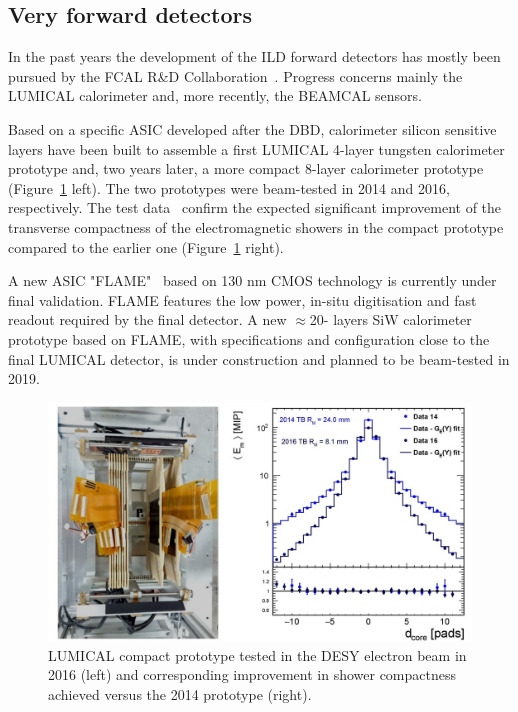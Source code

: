 \subsection{Very forward detectors}

In the past years the development of the ILD forward detectors has mostly been pursued by the FCAL R\&D Collaboration~\cite{ild:bib:FCAL}. Progress concerns mainly the LUMICAL calorimeter and, more recently, the BEAMCAL sensors.

Based on a specific ASIC developed after the DBD, calorimeter silicon sensitive layers have been built to assemble a first LUMICAL 4-layer tungsten calorimeter prototype and, two years later, a more compact 8-layer calorimeter prototype (Figure~\ref{fig:det:LUMICAL_perf} left). The two prototypes were beam-tested in 2014 and 2016, respectively. The test data~\cite{Abramowicz:2018vwb} confirm the expected significant improvement of the transverse compactness of the electromagnetic showers in the compact prototype compared to the earlier one (Figure~\ref{fig:det:LUMICAL_perf} right). 

A new ASIC "FLAME"~\cite{ild:bib:FLAME} based on 130 nm CMOS technology is currently under final validation. FLAME features the low power, in-situ digitisation and fast readout required by the final detector. A new $\approx$20- layers SiW calorimeter prototype based on FLAME, with specifications and configuration close to the final LUMICAL detector, is under construction and planned to be beam-tested in 2019. 

\begin{figure}[t!]
\centering
\includegraphics[width=1.0\hsize]{Detector/fig/LUMICAL_perf.jpg}
\caption{LUMICAL compact prototype tested in the DESY electron beam in 2016 (left) and corresponding improvement in shower compactness achieved versus the 2014 prototype (right).}
\label{fig:det:LUMICAL_perf}
\end{figure}


